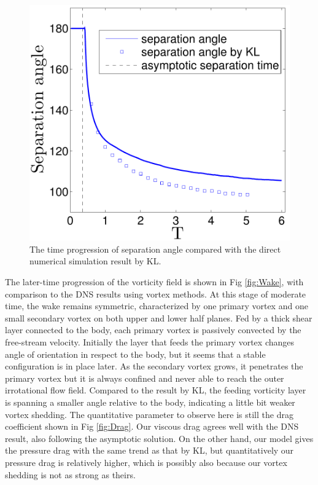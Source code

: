 \begin{figure}
 \begin{center}
 \includegraphics[width=12cm]{./Figures/results/static/separation_angle.pdf}
 \end{center}
 \caption[Evolution of separation angle]{The time progression of separation angle compared with the direct numerical simulation result by KL.}
 \label{fig:SeparationAngle}
\end{figure}


The later-time progression of the vorticity field is shown in Fig \ref{fig:Wake}, with comparison to the DNS results using vortex methods.
At this stage of moderate time, the wake remains symmetric,  characterized by one primary vortex and one small secondary vortex on both upper and lower half planes. 
Fed by a thick shear layer connected to the body, each primary vortex is passively convected by the free-stream velocity.
Initially the layer that feeds the primary vortex changes angle of orientation in respect to the body, but it seems that a stable configuration is in place later.
As the secondary vortex grows, it penetrates the primary vortex but it is always confined and never able to reach the outer irrotational flow field.
Compared to the result by KL, the feeding vorticity layer is spanning a smaller angle relative to the body, indicating a little bit weaker vortex shedding. 
The quantitative parameter to observe here is still the drag coefficient shown in Fig \ref{fig:Drag}.
Our viscous drag agrees well with the DNS result, also following the asymptotic solution.
On the other hand, our model gives the pressure drag with the same trend as that by KL, but quantitatively our pressure drag is relatively higher, which is possibly also because our vortex shedding is not as strong as theirs. 

